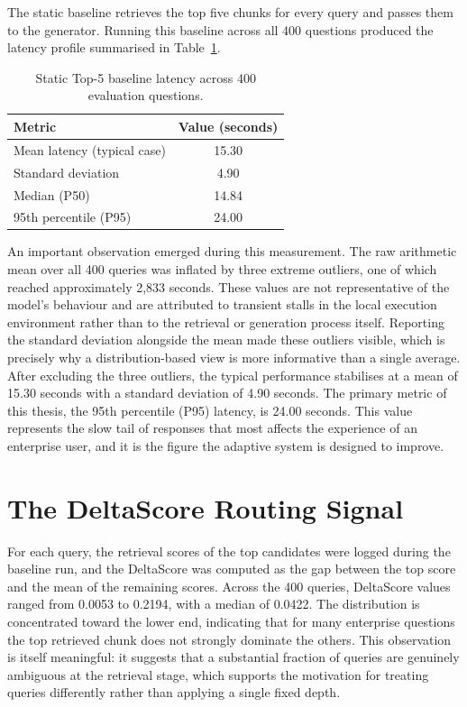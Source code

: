 \documentclass[12pt, a4paper, oneside]{report}
\begin{document}
The static baseline retrieves the top five chunks for every query and passes them to the generator. Running this baseline across all 400 questions produced the latency profile summarised in Table~\ref{tab:baseline}.

\begin{table}[ht]
\centering
\caption{Static Top-5 baseline latency across 400 evaluation questions.}
\label{tab:baseline}
\begin{tabular}{@{}lc@{}}
\toprule
\textbf{Metric} & \textbf{Value (seconds)} \\
\midrule
Mean latency (typical case) & 15.30 \\
Standard deviation & 4.90 \\
Median (P50) & 14.84 \\
95th percentile (P95) & 24.00 \\
\bottomrule
\end{tabular}
\end{table}

An important observation emerged during this measurement. The raw arithmetic mean over all 400 queries was inflated by three extreme outliers, one of which reached approximately 2{,}833 seconds. These values are not representative of the model's behaviour and are attributed to transient stalls in the local execution environment rather than to the retrieval or generation process itself. Reporting the standard deviation alongside the mean made these outliers visible, which is precisely why a distribution-based view is more informative than a single average. After excluding the three outliers, the typical performance stabilises at a mean of 15.30 seconds with a standard deviation of 4.90 seconds. The primary metric of this thesis, the 95th percentile (P95) latency, is 24.00 seconds. This value represents the slow tail of responses that most affects the experience of an enterprise user, and it is the figure the adaptive system is designed to improve.

\section{The DeltaScore Routing Signal}

For each query, the retrieval scores of the top candidates were logged during the baseline run, and the DeltaScore was computed as the gap between the top score and the mean of the remaining scores. Across the 400 queries, DeltaScore values ranged from 0.0053 to 0.2194, with a median of 0.0422. The distribution is concentrated toward the lower end, indicating that for many enterprise questions the top retrieved chunk does not strongly dominate the others. This observation is itself meaningful: it suggests that a substantial fraction of queries are genuinely ambiguous at the retrieval stage, which supports the motivation for treating queries differently rather than applying a single fixed depth.
\end{document}
